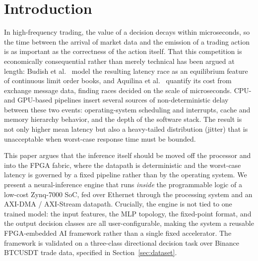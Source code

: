 \documentclass[final,5p,times,twocolumn]{elsarticle}
\begin{document}
\section{Introduction}
In high-frequency trading, the value of a decision decays within microseconds,
so the time between the arrival of market data and the emission of a trading
action is as important as the correctness of the action itself. That this
competition is economically consequential rather than merely technical has been
argued at length: Budish et al.~\cite{Budish2015} model the resulting
latency race as an equilibrium feature of continuous limit order books, and
Aquilina et al.~\cite{Aquilina2022} quantify its cost from exchange message
data, finding races decided on the scale of microseconds. CPU- and
GPU-based pipelines insert several sources of non-deterministic delay between
these two events: operating-system scheduling and interrupts, cache and memory
hierarchy behavior, and the depth of the software stack. The result is not
only higher mean latency but also a heavy-tailed distribution (jitter) that is
unacceptable when worst-case response time must be bounded.

This paper argues that the inference itself should be moved off the processor
and into the FPGA fabric, where the datapath is deterministic and the
worst-case latency is governed by a fixed pipeline rather than by the operating
system. We present a neural-inference engine that runs \emph{inside} the
programmable logic of a low-cost Zynq-7000 SoC, fed over Ethernet through the
processing system and an AXI-DMA / AXI-Stream datapath. Crucially, the engine
is not tied to one trained model: the input features, the MLP topology, the
fixed-point format, and the output decision classes are all user-configurable,
making the system a reusable FPGA-embedded AI framework rather than a single
fixed accelerator. The framework is validated on a three-class directional
decision task over Binance BTCUSDT trade data, specified in
Section~\ref{sec:dataset}.

\end{document}
